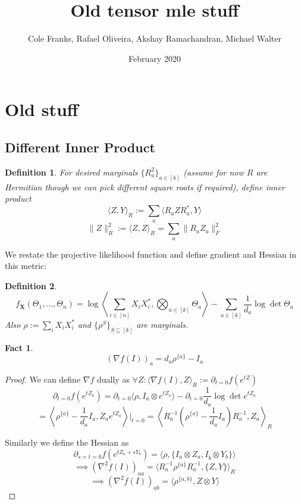 \documentclass{article}
\title{Old tensor mle stuff}
\author{Cole Franks, Rafael Oliveira, Akshay Ramachandran, Michael Walter}
\date{February 2020}
\newtheorem{fact}[theorem]{Fact}
\newtheorem{definition}{Definition}
\renewcommand{\vec}{\bm}
\begin{document}
\maketitle
\tableofcontents


\section{Old stuff}

\subsection{Different Inner Product}

\begin{definition}
For desired marginals $\{R_{a}^{2}\}_{a \in [k]}$ (assume for now $R$ are Hermitian though we can pick different square roots if required), define inner product
\[ \langle Z, Y \rangle_{R} := \sum_{a} \langle R_{a} Z R_{a}^{*}, Y \rangle \]
\[ \|Z\|_{R}^{2} := \langle Z, Z \rangle_{R} = \sum_{a} \|R_{a} Z_{a}\|_{F}^{2}   \]
\end{definition}

We restate the projective likelihood function and define gradient and Hessian in this metric:

\begin{definition}
\[ f_{\vec X}(\Theta_1, \dots, \Theta_n) = \log \left\langle \sum_{i \in [n]} X_{i} X_{i}^{*},  \bigotimes_{a \in [k]} \Theta_a \right\rangle - \sum_{a \in [k]} \frac{1}{d_a} \log\det \Theta_a  \]
Also $\rho := \sum_{i} X_{i} X_{i}^{*}$ and $\{\rho^{S}\}_{S \subseteq [k]}$ are marginals.
\end{definition}

\begin{fact}
\[ (\nabla f(I))_{a} = d_{a} \rho^{\{a\}} - I_{a}  \]
\end{fact}
\begin{proof}
We can define $\nabla f$ dually as $\forall Z: \langle \nabla f(I), Z \rangle_{R} := \partial_{t=0} f(e^{tZ})$
\[ \partial_{t=0} f(e^{t Z_{a}}) = \partial_{t=0} \langle \rho, I_{\overline{a}} \otimes e^{tZ_{a}}  \rangle - \partial_{t=0} \frac{1}{d_{a}} \log\det e^{t Z_{a}}  \]
\[ = \left\langle \rho^{\{a\}} - \frac{1}{d_{a}} I_{a}, Z_{a} e^{t Z_{a}} \right\rangle|_{t=0} = \left\langle R_{a}^{-1} \left( \rho^{\{a\}} - \frac{1}{d_{a}} I_{a} \right) R_{a}^{-1}, Z_{a} \right\rangle_{R}   \]

Similarly we define the Hessian as
\[ \partial_{s=t=0} f(e^{tZ_{a} + sY_{b}}) = \langle \rho, \{ I_{\overline{a}} \otimes Z_{a}, I_{\overline{b}} \otimes Y_{b} \} \rangle   \]
\[ \implies (\nabla^{2} f(I))_{aa} = \langle R_{a}^{-1} \rho^{\{a\}} R_{a}^{-1}, \{Z, Y\} \rangle_{R}    \]
\[ \implies (\nabla^{2} f(I))_{ab} = \langle \rho^{\{a,b\}}, Z \otimes Y \rangle   \]
\end{proof}
\end{document}
